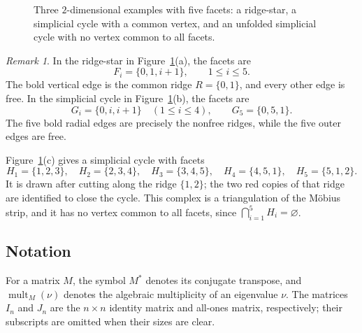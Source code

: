 \documentclass[12pt]{article}
\theoremstyle{remark}
\newtheorem{remark}{Remark}
\newcommand{\mult}{\operatorname{mult}}
\begin{document}
\begin{figure}[H]

\caption{Three $2$-dimensional examples with five  facets: a ridge-star, a simplicial cycle with a common vertex, and an unfolded simplicial cycle with no vertex common to all facets.}
\label{fig:simplicial-examples}
\end{figure}

\begin{remark}
In the ridge-star in Figure~\ref{fig:simplicial-examples}(a), the facets are
\[
F_i=\{0,1,i+1\},\qquad 1\le i\le5.
\]
The bold vertical edge is the common ridge $R=\{0,1\}$, and every other edge is free.  In the simplicial cycle in Figure~\ref{fig:simplicial-examples}(b), the facets are
\[
G_i=\{0,i,i+1\}\quad(1\le i\le4),
\qquad
G_5=\{0,5,1\}.
\]
The five bold radial edges are precisely the nonfree ridges, while the five outer edges are free.

Figure~\ref{fig:simplicial-examples}(c) gives a simplicial cycle with facets
\[
H_1=\{1,2,3\},\quad H_2=\{2,3,4\},\quad
H_3=\{3,4,5\},\quad H_4=\{4,5,1\},\quad
H_5=\{5,1,2\}.
\]
It is drawn after cutting along the ridge $\{1,2\}$; the two red copies of that ridge are identified to close the cycle.  This complex is a triangulation of the M\"obius strip, and it has no vertex common to all facets, since $\bigcap_{i=1}^5H_i=\varnothing$.
\end{remark}

\subsection{Notation}

For a matrix $M$, the symbol $M^*$ denotes its conjugate transpose, and $\mult_M(\nu)$ denotes the algebraic multiplicity of an eigenvalue $\nu$.  The matrices $I_n$ and $J_n$ are the $n\times n$ identity matrix and all-ones matrix, respectively; their subscripts are omitted when their sizes are clear.
\end{document}
